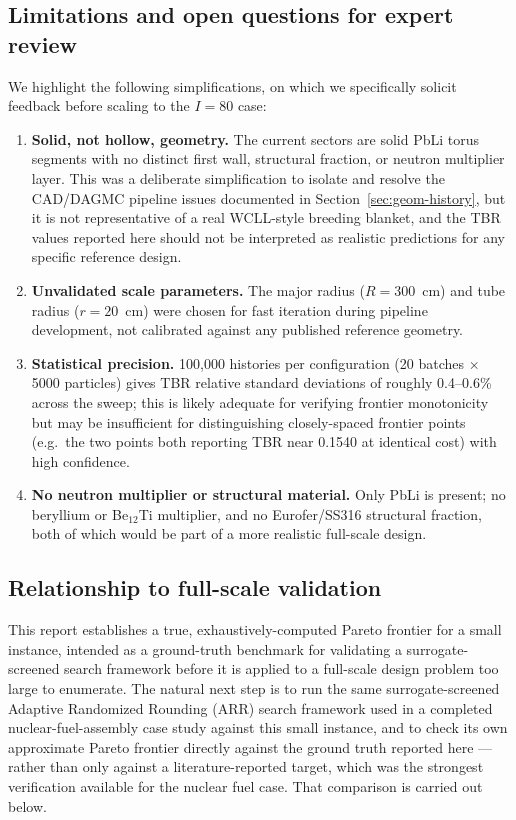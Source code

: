 \documentclass[11pt]{article}
\begin{document}
\subsection{Limitations and open questions for expert review}

We highlight the following simplifications, on which we specifically
solicit feedback before scaling to the $I=80$ case:

\begin{enumerate}
\item \textbf{Solid, not hollow, geometry.} The current sectors are solid
PbLi torus segments with no distinct first wall, structural fraction, or
neutron multiplier layer. This was a deliberate simplification to isolate
and resolve the CAD/DAGMC pipeline issues documented in
Section~\ref{sec:geom-history}, but it is not representative of a real
WCLL-style breeding blanket, and the TBR values reported here should not
be interpreted as realistic predictions for any specific reference design.
\item \textbf{Unvalidated scale parameters.} The major radius
($R=300$~cm) and tube radius ($r=20$~cm) were chosen for fast iteration
during pipeline development, not calibrated against any published
reference geometry.
\item \textbf{Statistical precision.} 100{,}000 histories per
configuration (20 batches $\times$ 5000 particles) gives TBR relative
standard deviations of roughly 0.4--0.6\% across the sweep; this is likely
adequate for verifying frontier monotonicity but may be insufficient for
distinguishing closely-spaced frontier points (e.g.\ the two points both
reporting TBR near 0.1540 at identical cost) with high confidence.
\item \textbf{No neutron multiplier or structural material.} Only PbLi is
present; no beryllium or Be$_{12}$Ti multiplier, and no Eurofer/SS316
structural fraction, both of which would be part of a more realistic
full-scale design.
\end{enumerate}

\subsection{Relationship to full-scale validation}

This report establishes a true, exhaustively-computed Pareto frontier for
a small instance, intended as a ground-truth benchmark for validating a
surrogate-screened search framework before it is applied to a full-scale
design problem too large to enumerate. The natural next step is to run
the same surrogate-screened Adaptive Randomized Rounding (ARR) search
framework used in a completed nuclear-fuel-assembly case study against
this small instance, and to check its own approximate Pareto frontier
directly against the ground truth reported here --- rather than only
against a literature-reported target, which was the strongest
verification available for the nuclear fuel case. That comparison is
carried out below.
\end{document}
